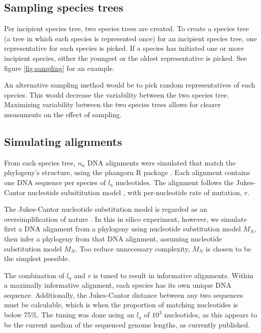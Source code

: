 \documentclass{article}
\begin{document}
\subsection{Sampling species trees}
\label{subsec:sampling_species_trees}

Per incipient species tree, two species trees are created. 
To create a species tree (a tree in which each species is represented once)
for an incipient species tree, one representative for each species is picked. 
If a species has initiated one or more incipient species, either the youngest
or the oldest representative is picked. See figure \ref{fig:sampling} for an example.

An alternative sampling method would be to pick 
random representatives of each species. This would decrease the variability
between the two species tree. Maximizing variability between the two
species trees allows for clearer measuments on the effect of sampling.   


\subsection{Simulating alignments}
\label{subsec:simulating_alignments}

From each species tree, $n_a$ DNA alignments were simulated that match the
phylogeny's structure, using the phangorn R package \cite{phangorn}. 
Each alignment contains one DNA sequence per species 
of $l_a$ nucleotides. The alignment follows the Jukes-Cantor nucleotide 
subsititution model \cite{cantor1969mammalian}, 
with per-nucleotide rate of mutation, $r$.

The Jukes-Cantor
nucleotide substitution model is regarded as an oversimplification of 
nature \cite{unknown}. In this in silico experiment, however, we simulate first
a DNA alignment from a phylogeny using nucleotide substitution model $M_N$, 
then infer a phylogeny from that DNA alignment, assuming nucleotide substitution model $M_N$.
Too reduce unnecessary complexity, $M_N$ is chosen to be the simplest possible.

The combination of $l_a$ and $r$ is tuned to result in informative alignments. 
Within a maximally informative alignment, each species has its own unique DNA sequence.
Additionally, the Jukes-Cantor distance \cite{unknown} between any 
two sequences must be calculable, which is when the proportion of matching nucleotides is below 75\%.
The tuning was done using an $l_a$ of $10^3$ nucleotides, 
as this appears to be the current median of the sequenced genome lengths, as currently published.
\end{document}
